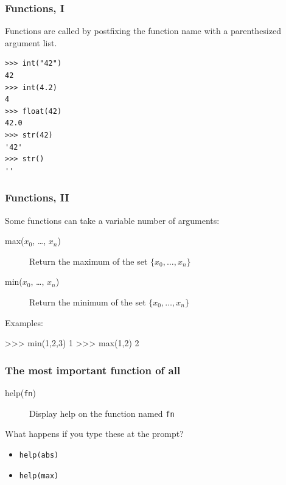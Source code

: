 \documentclass[english,serif,mathserif,xcolor=pdftex,dvipsnames,table]{beamer}
\begin{document}
\begin{frame}[fragile,label=func1]
  \frametitle{Functions, I}
  Functions are called by postfixing the function name with a
  parenthesized argument list.

  \+
\begin{lstlisting}
>>> int("42")
42
>>> int(4.2)
4
>>> float(42)
42.0
>>> str(42)
'42'
>>> str()
''
\end{lstlisting}

  \hyperlink{typeconv}{}
\end{frame}


\begin{frame}[fragile]
  \frametitle{Functions, II}
  Some functions can take a variable number of arguments:
  \begin{description}
    \item[max($x_0$, \ldots, $x_n$)] Return the maximum of the set $\{ x_0, \ldots, x_n \}$
    \item[min($x_0$, \ldots, $x_n$)] Return the minimum of the set $\{ x_0, \ldots, x_n \}$
  \end{description}

  \+
  Examples:
\begin{semiverbatim}
>>> min(1,2,3)
1
>>> max(1,2)
2
\end{semiverbatim}
\end{frame}


\begin{frame}[fragile]
  \frametitle{The most important function of all}
  \begin{description}
  \item[help(\texttt{fn})] Display help on the function named \texttt{fn}
  \end{description}

  \+
  \begin{question}
    What happens if you type these at the prompt?
    \begin{itemize}
    \item \texttt{help(abs)}
    \item \texttt{help(max)}
    \end{itemize}
  \end{question}
\end{frame}
\end{document}
